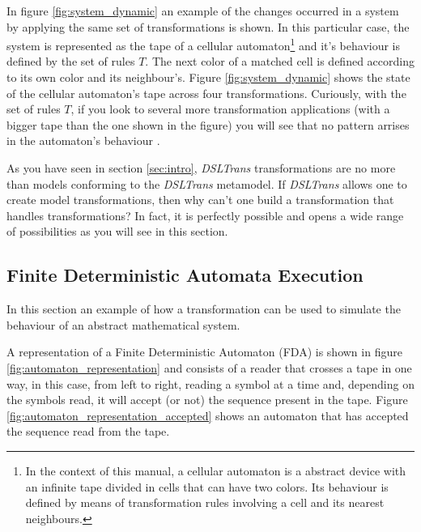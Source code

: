 In figure \ref{fig:system_dynamic} an example of the changes occurred in a
system by applying the same set of transformations is shown. In this particular
case, the system is represented as the tape of a cellular automaton\footnote{In the context of this
manual, a cellular automaton is a abstract device with an infinite tape
divided in cells that can have two colors. Its behaviour is defined by means of
transformation rules involving a cell and its nearest neighbours.} and it's
behaviour is defined by the set of rules $T$. The next color of a matched cell
is defined according to its own color and its neighbour's. Figure
\ref{fig:system_dynamic} shows the state of the cellular automaton's tape across
four transformations. Curiously, with the set of rules $T$, if you look to
several more transformation applications (with a bigger tape than the one
shown in the figure) you will see that no pattern arrises in the automaton's
behaviour \cite{stephen_wolfram_new_science}.

As you have seen in section \ref{sec:intro}, \emph{DSLTrans} transformations are
no more than models conforming to the \emph{DSLTrans} metamodel. If
\emph{DSLTrans} allows one to create model transformations, then why can't one
build a transformation that handles transformations? In fact, it is perfectly
possible and opens a wide range of possibilities as you will see in this
section.


\clearpage

\subsection{Finite Deterministic Automata Execution}
\label{subsec:fda_execution}

In this section an example of how a transformation can be used to simulate the behaviour of an abstract mathematical system.

A representation of a Finite Deterministic Automaton (FDA) is shown in figure \ref{fig:automaton_representation} and consists of a reader that crosses a tape in one way, in this case, from left to right, reading a symbol at a time and, depending on the symbols read, it will accept (or not) the sequence present in the tape. 
Figure \ref{fig:automaton_representation_accepted} shows an automaton that has accepted the sequence read from the tape.

